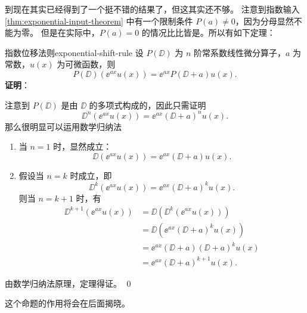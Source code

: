 到现在其实已经得到了一个挺不错的结果了，但这其实还不够。
注意到指数输入 \cref{thm:exponential-input-theorem} 中有一个限制条件 $ P(a) \neq 0 $，因为分母显然不能为零。
但是在实际中，$ P(a) = 0 $ 的情况比比皆是。所以有如下定理：
\begin{theorem}{指数位移法则}{exponential-shift-rule}
    设 $ P(\DD) $ 为 $ n $ 阶常系数线性微分算子，$ a $ 为常数，$ u(x) $ 为可微函数，则
    \begin{equation}
        P(\DD) \left( \ee^{ax} u(x) \right) = \ee^{ax} P(\DD + a) u(x) .
    \end{equation}
    \textbf{证明}：

    注意到 $ P(\DD) $ 是由 $ \DD $ 的多项式构成的，因此只需证明
    \begin{equation*}
        \DD^n \left( \ee^{ax} u(x) \right) = \ee^{ax} (\DD + a)^n u(x) .
    \end{equation*}
    那么很明显可以运用数学归纳法
    \begin{enumerate}
        \item 当 $ n = 1 $ 时，显然成立：
              \begin{equation*}
                  \DD \left( \ee^{ax} u(x) \right) = \ee^{ax} (\DD + a) u(x) .
              \end{equation*}
        \item 假设当 $ n = k $ 时成立，即
              \begin{equation*}
                  \DD^k \left( \ee^{ax} u(x) \right) = \ee^{ax} (\DD + a)^k u(x) .
              \end{equation*}
              则当 $ n = k + 1 $ 时，有
              \begin{equation*}
                  \begin{aligned}
                      \DD^{k+1} \left( \ee^{ax} u(x) \right) & = \DD \left( \DD^k \left( \ee^{ax} u(x) \right) \right) \\
                                                             & = \DD \left( \ee^{ax} (\DD + a)^k u(x) \right)          \\
                                                             & = \ee^{ax} (\DD + a) (\DD + a)^k u(x)                   \\
                                                             & = \ee^{ax} (\DD + a)^{k+1} u(x) .
                  \end{aligned}
              \end{equation*}
    \end{enumerate}
    由数学归纳法原理，定理得证。
    \qed
\end{theorem}
这个命题的作用将会在后面揭晓。


